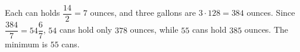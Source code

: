 Each can holds $\dfrac{14}{2}=7$ ounces, and three gallons are $3\cdot128=384$ ounces. Since $\dfrac{384}{7}=54\dfrac67$, $54$ cans hold only $378$ ounces, while $55$ cans hold $385$ ounces. The minimum is $\boxed{55}$ cans.
